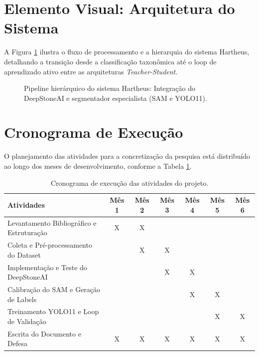 \section{Elemento Visual: Arquitetura do Sistema}
A Figura \ref{fig:arquitetura_hartheus} ilustra o fluxo de processamento e a hierarquia do sistema Hartheus, detalhando a transição desde a classificação taxonômica até o loop de aprendizado ativo entre as arquiteturas \textit{Teacher-Student}.

\begin{figure}[htpb]
    \centering
    \caption{Pipeline hierárquico do sistema Hartheus: Integração do DeepStoneAI e segmentador especialista (SAM e YOLO11).}
    \label{fig:arquitetura_hartheus}
\end{figure}

\section{Cronograma de Execução}
O planejamento das atividades para a concretização da pesquisa está distribuído ao longo dos meses de desenvolvimento, conforme a Tabela \ref{tab:cronograma}.

\begin{table}[htpb]
    \centering
    \caption{Cronograma de execução das atividades do projeto.}
    \vspace{0.2cm}
    \begin{tabular}{|p{6cm}|c|c|c|c|c|c|}
        \hline
        \textbf{Atividades} & \textbf{Mês 1} & \textbf{Mês 2} & \textbf{Mês 3} & \textbf{Mês 4} & \textbf{Mês 5} & \textbf{Mês 6} \\ \hline
        Levantamento Bibliográfico e Estruturação & X & X & & & & \\ \hline
        Coleta e Pré-processamento do Dataset & & X & X & & & \\ \hline
        Implementação e Teste do DeepStoneAI & & & X & X & & \\ \hline
        Calibração do SAM e Geração de Labels & & & & X & X & \\ \hline
        Treinamento YOLO11 e Loop de Validação & & & & & X & X \\ \hline
        Escrita do Documento e Defesa & X & X & X & X & X & X \\ \hline
    \end{tabular}
    \label{tab:cronograma}
\end{table}

